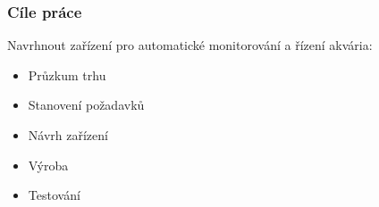 \documentclass[%
  12pt,       				%
	t,                  %
	aspectratio=1610,   %
	unicode,						%
]{beamer}				    	%
\begin{document}
\disablenavigationsymbols

\maketitle

\begin{frame} 
	\frametitle{Cíle práce}
	Navrhnout zařízení pro automatické monitorování a řízení akvária:\\[0ex]
	\begin{itemize}
		\item Průzkum trhu
		\item Stanovení požadavků
		\item Návrh zařízení
		\item Výroba
		\item Testování
	\end{itemize}
\end{frame}





\end{document}
